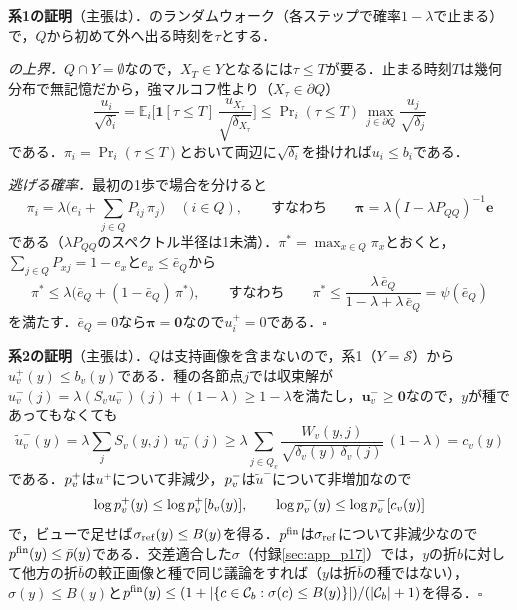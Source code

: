 \appblock
\textbf{系1の証明}（主張は）．のランダムウォーク（各ステップで確率$1-\lambda$で止まる）で，$Q$から初めて外へ出る時刻を$\tau$とする．

\textit{の上界．}$Q\cap Y=\emptyset$なので，$X_T\in Y$となるには$\tau\le T$が要る．止まる時刻$T$は幾何分布で無記憶だから，強マルコフ性より（$X_\tau\in\partial Q$）
\begin{equation*}
\frac{u_i}{\sqrt{\delta_i}}
=\mathbb{E}_i\Big[\mathbf{1}[\tau\le T]\,\frac{u_{X_\tau}}{\sqrt{\delta_{X_\tau}}}\Big]
\le\Pr\nolimits_i(\tau\le T)\,\max_{j\in\partial Q}\frac{u_j}{\sqrt{\delta_j}}
\end{equation*}
である．$\pi_i=\Pr_i(\tau\le T)$とおいて両辺に$\sqrt{\delta_i}$を掛ければ$u_i\le b_i$である．

\textit{逃げる確率．}最初の1歩で場合を分けると
\begin{equation*}
\pi_i=\lambda\Big(e_i+\sum_{j\in Q}P_{ij}\,\pi_j\Big)\quad(i\in Q),\qquad\text{すなわち}\qquad\boldsymbol{\pi}=\lambda(I-\lambda P_{QQ})^{-1}\mathbf{e}
\end{equation*}
である（$\lambda P_{QQ}$のスペクトル半径は1未満）．$\pi^{*}=\max_{x\in Q}\pi_x$とおくと，$\sum_{j\in Q}P_{xj}=1-e_x$と$e_x\le\bar e_Q$から
\begin{equation*}
\pi^{*}\le\lambda\big(\bar e_Q+(1-\bar e_Q)\,\pi^{*}\big),\qquad\text{すなわち}\qquad
\pi^{*}\le\frac{\lambda\,\bar e_Q}{1-\lambda+\lambda\,\bar e_Q}=\psi(\bar e_Q)
\end{equation*}
を満たす．$\bar e_Q=0$なら$\boldsymbol{\pi}=\mathbf{0}$なので$u^{+}_i=0$である．$\square$

\appblock
\textbf{系2の証明}（主張は）．$Q$は支持画像を含まないので，系1（$Y=\mathcal{S}$）から$u^{+}_v(y)\le b_v(y)$である．種の各節点$j$では収束解が$u^{-}_v(j)=\lambda(S_vu^{-}_v)(j)+(1-\lambda)\ge1-\lambda$を満たし，$\mathbf{u}^{-}_v\ge\mathbf{0}$なので，$y$が種であってもなくても
\begin{equation*}
\tilde u^{-}_v(y)=\lambda\sum_jS_v(y,j)\,u^{-}_v(j)\ge\lambda\sum_{j\in\hat{Q}_v}\frac{W_v(y,j)}{\sqrt{\delta_v(y)\,\delta_v(j)}}\,(1-\lambda)=c_v(y)
\end{equation*}
である．$p^{+}_v$は$u^{+}$について非減少，$p^{-}_v$は$\tilde u^{-}$について非増加なので
\begin{equation*}
\log p^{+}_v(y)\le\log p^{+}_v[b_v(y)],\qquad\log p^{-}_v(y)\le\log p^{-}_v[c_v(y)]
\end{equation*}
で，ビューで足せば$\sigma_{\mathrm{ref}}(y)\le B(y)$を得る．$p^{\mathrm{fin}}$は$\sigma_{\mathrm{ref}}$について非減少なので$p^{\mathrm{fin}}(y)\le\bar p(y)$である．交差適合した$\sigma$（付録\ref{sec:app_p17}）では，$y$の折$b$に対して他方の折$\bar b$の較正画像と種で同じ議論をすれば（$y$は折$\bar b$の種ではない），$\sigma(y)\le B(y)$と$p^{\mathrm{fin}}(y)\le(1+|\{c\in\mathcal{C}_b:\sigma(c)\le B(y)\}|)/(|\mathcal{C}_b|+1)$を得る．$\square$

